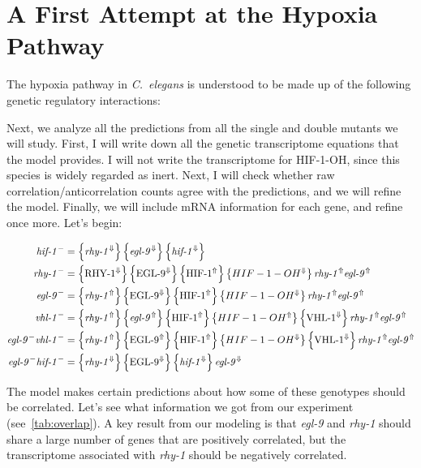 \documentclass{article}
\newcommand{\transcr}[1]{\left \{ #1 \right \}}
\newcommand{\gene}[1]{\textrm{\emph{#1}}}
\newcommand{\mrna}[1]{\textrm{\emph{#1}}}
\newcommand{\protein}[1]{\textrm{#1}}
\theoremstyle{definition}
\begin{document}
\section{A First Attempt at the Hypoxia Pathway}
\label{sec:first_attempt_hyp}

The hypoxia pathway in \emph{C.~elegans} is understood to be made up of the following genetic regulatory interactions:


Next, we analyze all the predictions from all the single and double mutants we will study. First, I will write down all the genetic transcriptome equations that the model provides. I will not write the transcriptome for \protein{HIF-1-OH}, since this species is widely regarded as inert. Next, I will check whether raw correlation/anticorrelation counts agree with the predictions, and we will refine the model. Finally, we will include mRNA information for each gene, and refine once more. Let's begin:

\begin{align}
  \gene{hif-1}^- &= \transcr{\gene{rhy-1}^\Downarrow}\transcr{\gene{egl-9}^\Downarrow}\transcr{\gene{hif-1}^\Downarrow}\\
  \gene{rhy-1}^- &= \transcr{\protein{RHY-1}^\Downarrow}\transcr{\protein{EGL-9}^\Downarrow}\transcr{\protein{HIF-1}^\Uparrow}\transcr{HIF-1-OH^\Downarrow}\mrna{rhy-1}^\Uparrow\mrna{egl-9}^\Uparrow \\
  \gene{egl-9}^- &= \transcr{\gene{rhy-1}^\Uparrow}\transcr{\protein{EGL-9}^\Downarrow}\transcr{\protein{HIF-1}^\Uparrow}\transcr{HIF-1-OH^\Downarrow}\mrna{rhy-1}^\Uparrow\mrna{egl-9}^\Uparrow \\
  \gene{vhl-1}^- &= \transcr{\gene{rhy-1}^\Uparrow}\transcr{\gene{egl-9}^\Uparrow}\transcr{\protein{HIF-1}^\Uparrow}\transcr{HIF-1-OH^\Uparrow}\transcr{\protein{VHL-1}^\Downarrow}\mrna{rhy-1}^\Uparrow\mrna{egl-9}^\Uparrow \\
  \gene{egl-9}^-\gene{vhl-1}^- &= \transcr{\gene{rhy-1}^\Uparrow}\transcr{\protein{EGL-9}^\Uparrow}\transcr{\protein{HIF-1}^\Uparrow}\transcr{HIF-1-OH^\Downarrow}\transcr{\protein{VHL-1}^\Downarrow}\mrna{rhy-1}^\Uparrow\mrna{egl-9}^\Uparrow \\
  \gene{egl-9}^-\gene{hif-1}^- &= \transcr{\gene{rhy-1}^\Downarrow}\transcr{\protein{EGL-9}^\Downarrow}\transcr{\gene{hif-1}^\Downarrow}\mrna{egl-9}^\Downarrow
\end{align}

The model makes certain predictions about how some of these genotypes should be correlated. Let's see what information we got from our experiment (see~\ref{tab:overlap}). A key result from our modeling is that \gene{egl-9} and \gene{rhy-1} should share a large number of genes that are positively correlated, but the transcriptome associated with \gene{rhy-1} should be negatively correlated.
\end{document}
